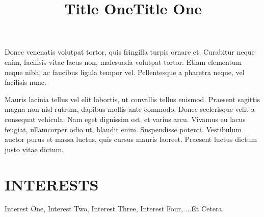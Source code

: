 \documentclass[margin]{res}
\begin{document}
\begin{resume}
\title{\textbf{Title One}}
\begin{position}
Donec venenatis volutpat tortor, quis fringilla turpis ornare et. Curabitur
neque enim, facilisis vitae lacus non, malesuada volutpat tortor. Etiam
elementum neque nibh, ac faucibus ligula tempor vel. Pellentesque a pharetra
neque, vel facilisis nunc.
\end{position}

\title{\textbf{Title One}}
\begin{position}
Mauris lacinia tellus vel elit lobortis, ut convallis tellus euismod. Praesent
sagittis magna non nisl rutrum, dapibus mollis ante commodo. Donec scelerisque
velit a consequat vehicula. Nam eget dignissim est, et varius arcu. Vivamus eu
lacus feugiat, ullamcorper odio ut, blandit enim. Suspendisse potenti.
Vestibulum auctor purus et massa luctus, quis cursus mauris laoreet. Praesent
luctus dictum justo vitae dictum.
\end{position}
\section{INTERESTS}
Interest One, Interest Two, Interest Three, Interest Four, ...Et Cetera.
\end{resume}
\end{document}
